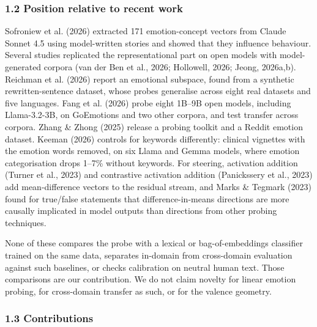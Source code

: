 \documentclass[
  10pt,
]{article}
\begin{document}
\subsubsection{1.2 Position relative to recent
work}\label{12-position-relative-to-recent-work}

Sofroniew et al. (2026) extracted 171 emotion-concept vectors from
Claude Sonnet 4.5 using model-written stories and showed that they
influence behaviour. Several studies replicated the representational
part on open models with model-generated corpora (van der Ben et al.,
2026; Hollowell, 2026; Jeong, 2026a,b). Reichman et al. (2026) report an
emotional subspace, found from a synthetic rewritten-sentence dataset,
whose probes generalise across eight real datasets and five languages.
Fang et al. (2026) probe eight 1B--9B open models, including
Llama-3.2-3B, on GoEmotions and two other corpora, and test transfer
across corpora. Zhang \& Zhong (2025) release a probing toolkit and a
Reddit emotion dataset. Keeman (2026) controls for keywords differently:
clinical vignettes with the emotion words removed, on six Llama and
Gemma models, where emotion categorisation drops 1--7\% without
keywords. For steering, activation addition (Turner et al., 2023) and
contrastive activation addition (Panickssery et al., 2023) add
mean-difference vectors to the residual stream, and Marks \& Tegmark
(2023) found for true/false statements that difference-in-means
directions are more causally implicated in model outputs than directions
from other probing techniques.

None of these compares the probe with a lexical or bag-of-embeddings
classifier trained on the same data, separates in-domain from
cross-domain evaluation against such baselines, or checks calibration on
neutral human text. Those comparisons are our contribution. We do not
claim novelty for linear emotion probing, for cross-domain transfer as
such, or for the valence geometry.

\subsubsection{1.3 Contributions}\label{13-contributions}
\end{document}
